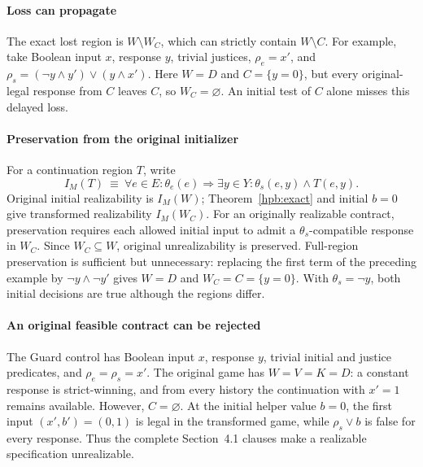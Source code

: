 \paragraph{Loss can propagate}
The exact lost region is $W\setminus W_C$, which can strictly contain
$W\setminus C$. For example, take Boolean input $x$, response $y$,
trivial justices, $\rho_e=x'$, and
$\rho_s=(\neg y\land y')\lor(y\land x')$.
Here $W=D$ and $C=\{y=0\}$, but every original-legal response from
$C$ leaves $C$, so $W_C=\varnothing$. An initial test of $C$ alone
misses this delayed loss.

\paragraph{Preservation from the original initializer}
For a continuation region $T$, write
\begin{equation}
 I_M(T)\ \equiv\ \forall e\in E:\theta_e(e)\Rightarrow
 \exists y\in Y:\theta_s(e,y)\land T(e,y).
 \label{hpb:initial}
\end{equation}
Original initial realizability is $I_M(W)$; Theorem~\ref{hpb:exact}
and initial $b=0$ give transformed realizability $I_M(W_C)$.
For an originally realizable contract, preservation requires each
allowed initial input to admit a
$\theta_s$-compatible response in $W_C$. Since $W_C\subseteq W$,
original unrealizability is preserved. Full-region preservation is
sufficient but unnecessary: replacing the first term of the preceding
example by $\neg y\land\neg y'$ gives $W=D$ and
$W_C=C=\{y=0\}$. With $\theta_s=\neg y$, both initial decisions
are true although the regions differ.

\paragraph{An original feasible contract can be rejected}
The Guard control has Boolean input $x$, response $y$, trivial
initial and justice predicates, and $\rho_e=\rho_s=x'$.
The original game has $W=V=K=D$: a constant response is strict-winning,
and from every history the continuation with $x'=1$ remains available.
However, $C=\varnothing$. At the initial helper value $b=0$,
the first input $(x',b')=(0,1)$ is legal in the transformed game,
while $\rho_s\lor b$ is false for every response.
Thus the complete Section~4.1 clauses make a realizable
specification unrealizable.


